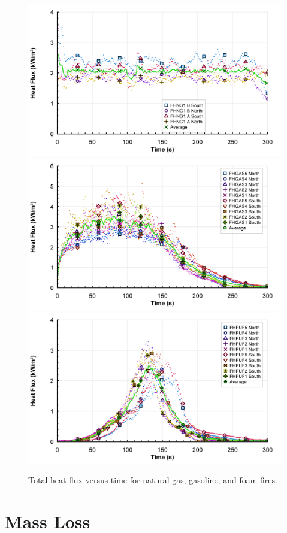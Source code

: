 \documentclass[twoside]{uocthesis}
\begin{document}
{{\begin{figure}[p]
  \centering
  \includegraphics[width=4.5in]{../Figures/Fig9}\\
  \includegraphics[width=4.5in]{../Figures/Fig10}\\
  \includegraphics[width=4.5in]{../Figures/Fig11}\\
  \caption[Total heat flux versus time for natural gas, gasoline, and foam fires]{Total heat flux versus time for natural gas, gasoline, and foam fires.}
  \label{Flux}
\end{figure}


\section{Mass Loss}

}}
\end{document}
